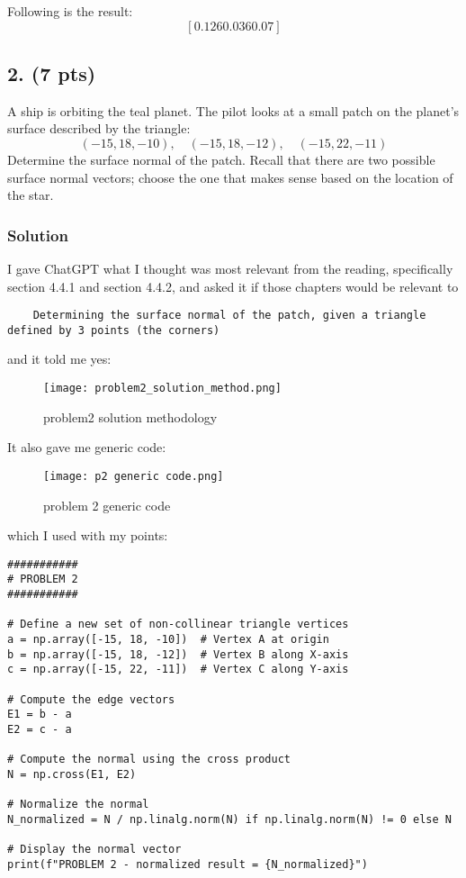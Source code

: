 \documentclass{article}
\begin{document}
Following is the result:
\[[0.126 0.036 0.07 ]\]

\subsection*{2. (7 pts)}
A ship is orbiting the teal planet. The pilot looks at a small patch on the planet’s surface described by the triangle:
\[
(-15, 18, -10), \quad (-15, 18, -12), \quad (-15, 22, -11)
\]
Determine the surface normal of the patch. Recall that there are two possible surface normal vectors; choose the one that makes sense based on the location of the star.

\subsubsection{Solution}
I gave ChatGPT what I thought was most relevant from the reading, specifically section 4.4.1 and section 4.4.2, and asked it if those chapters would be relevant to 
\begin{verbatim}
    Determining the surface normal of the patch, given a triangle defined by 3 points (the corners)
\end{verbatim}
and it told me yes:
\begin{figure}[H]
    \centering
    \texttt{[image: problem2\_solution\_method.png]}
    \caption{problem2 solution methodology}
    \label{fig:p2.1}
\end{figure}

It also gave me generic code:
\begin{figure}[H]
    \centering
    \texttt{[image: p2 generic code.png]}
    \caption{problem 2 generic code}
    \label{fig:p2.2}
\end{figure}

which I used with my points:

\begin{verbatim}
###########
# PROBLEM 2
###########

# Define a new set of non-collinear triangle vertices
a = np.array([-15, 18, -10])  # Vertex A at origin
b = np.array([-15, 18, -12])  # Vertex B along X-axis
c = np.array([-15, 22, -11])  # Vertex C along Y-axis

# Compute the edge vectors
E1 = b - a
E2 = c - a

# Compute the normal using the cross product
N = np.cross(E1, E2)

# Normalize the normal
N_normalized = N / np.linalg.norm(N) if np.linalg.norm(N) != 0 else N

# Display the normal vector
print(f"PROBLEM 2 - normalized result = {N_normalized}")
\end{verbatim}
\end{document}
